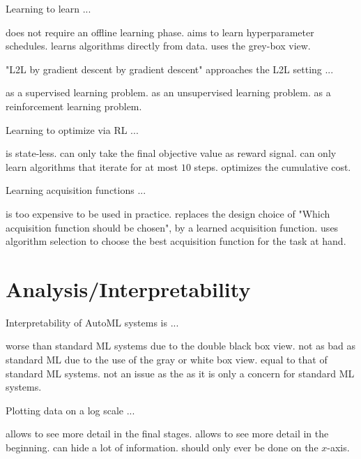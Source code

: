 \documentclass{exam}
\begin{document}
\begin{questions}
\question Learning to learn ...
\begin{choices}
    \choice does not require an offline learning phase.
    \choice aims to learn hyperparameter schedules.
    \choice learns algorithms directly from data. %
    \choice uses the grey-box view.
\end{choices}

\question "L2L by gradient descent by gradient descent" approaches the L2L setting ...
\begin{choices}
    \choice as a supervised learning problem. %
    \choice as an unsupervised learning problem.
    \choice as a reinforcement learning problem.
\end{choices}

\question Learning to optimize via RL ...
\begin{choices}
    \choice is state-less.
    \choice can only take the final objective value as reward signal.
    \choice can only learn algorithms that iterate for at most $10$ steps.
    \choice optimizes the cumulative cost. %
\end{choices}

\question Learning acquisition functions ...
\begin{choices}
    \choice is too expensive to be used in practice.
    \choice replaces the design choice of "Which acquisition function should be chosen", by a learned acquisition function. %
    \choice uses algorithm selection to choose the best acquisition function for the task at hand.
\end{choices}



\clearpage
\section{Analysis/Interpretability}
\question Interpretability of AutoML systems is ...
\begin{choices}
    \choice worse than standard ML systems due to the double black box view. %
    \choice not as bad as standard ML due to the use of the gray or white box view.
    \choice equal to that of standard ML systems.
    \choice not an issue as the as it is only a concern for standard ML systems.
\end{choices}

\question Plotting data on a log scale ...
\begin{choices}
    \choice allows to see more detail in the final stages.
    \choice allows to see more detail in the beginning. %
    \choice can hide a lot of information.
    \choice should only ever be done on the $x$-axis.
\end{choices}


\end{questions}
\end{document}

